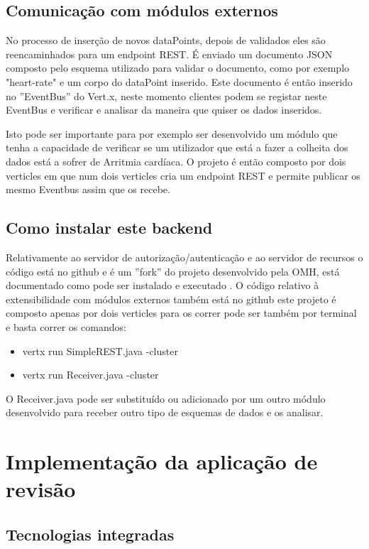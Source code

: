 \subsection{Comunicação com módulos externos}
No processo de inserção de novos dataPoints, depois de validados eles são reencaminhados para um endpoint \gls{REST}. É enviado um documento \gls{JSON} composto pelo esquema utilizado para validar o documento, como por exemplo "heart-rate" e um corpo do dataPoint inserido. Este documento é então inserido no ''EventBus'' do Vert.x, neste momento clientes podem se registar neste EventBus e verificar e analisar da maneira que quiser os dados inseridos. \par
Isto pode ser importante para por exemplo ser desenvolvido um módulo que tenha a capacidade de verificar se um utilizador que está a fazer a colheita dos dados está a sofrer de Arritmia cardíaca.
O projeto é então composto por dois verticles em que num dois verticles cria um endpoint \gls{REST} e permite publicar os mesmo Eventbus assim que os recebe.

\subsection{Como instalar este backend}
Relativamente ao servidor de autorização/autenticação e ao servidor de recursos o código está no github \cite{omh-code} e é um ''fork'' do projeto desenvolvido pela \gls{OMH}, está documentado como pode ser instalado e executado \cite{omh-runnatively}.
O código relativo à extensibilidade com módulos externos também está no github\cite{restpubsub} este projeto é composto apenas por dois verticles para os correr pode ser também por terminal e basta correr os comandos:
\begin{itemize}
    \item vertx run SimpleREST.java -cluster
    \item vertx run Receiver.java -cluster
\end{itemize}
O Receiver.java pode ser substituído ou adicionado por um outro módulo desenvolvido para receber outro tipo de esquemas de dados e os analisar.

\section{Implementação da aplicação de revisão}
\subsection{Tecnologias integradas}


